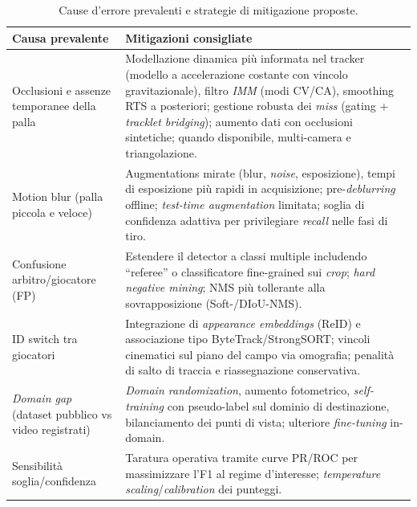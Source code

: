 \documentclass[12pt,a4paper,openright,twoside]{book}
\begin{document}
\begin{table}[t]
\centering
\caption{Cause d'errore prevalenti e strategie di mitigazione proposte.}
\label{tab:error_mitigation}
\renewcommand{\arraystretch}{1.15}
\begin{tabularx}{\linewidth}{
  >{\raggedright\arraybackslash}m{4.2cm}
  >{\raggedright\arraybackslash}X}
  \toprule
  \textbf{Causa prevalente} & \textbf{Mitigazioni consigliate} \\
  \midrule
  Occlusioni e assenze temporanee della palla &
  Modellazione dinamica più informata nel tracker 
  (modello a accelerazione costante con vincolo gravitazionale), 
  filtro \emph{IMM} (modi CV/CA), smoothing RTS a posteriori; 
  gestione robusta dei \emph{miss} (gating + \emph{tracklet bridging}); 
  aumento dati con occlusioni sintetiche; quando disponibile, 
  multi-camera e triangolazione. \\
  \addlinespace[2pt]
  Motion blur (palla piccola e veloce) &
  Augmentations mirate (blur, \emph{noise}, esposizione), 
  tempi di esposizione più rapidi in acquisizione; pre-\emph{deblurring} offline; 
  \emph{test-time augmentation} limitata; soglia di confidenza adattiva per 
  privilegiare \emph{recall} nelle fasi di tiro. \\
  \addlinespace[2pt]
  Confusione arbitro/giocatore (FP) &
  Estendere il detector a classi multiple includendo ``referee'' o classificatore 
  fine-grained sui \emph{crop}; \emph{hard negative mining}; NMS più tollerante 
  alla sovrapposizione (Soft-/DIoU-NMS). \\
  \addlinespace[2pt]
  ID switch tra giocatori &
  Integrazione di \emph{appearance embeddings} (ReID) e associazione 
  tipo ByteTrack/StrongSORT; vincoli cinematici sul piano del campo via omografia; 
  penalità di salto di traccia e riassegnazione conservativa. \\
  \addlinespace[2pt]
  \emph{Domain gap} (dataset pubblico vs video registrati) &
  \emph{Domain randomization}, aumento fotometrico, \emph{self-training} 
  con pseudo-label sul dominio di destinazione, bilanciamento dei punti di vista; 
  ulteriore \emph{fine-tuning} in-domain. \\
  \addlinespace[2pt]
  Sensibilità soglia/confidenza &
  Taratura operativa tramite curve PR/ROC per massimizzare l'F1 al regime d'interesse; 
  \emph{temperature scaling}/\emph{calibration} dei punteggi. \\
  \bottomrule
\end{tabularx}
\end{table}
\end{document}
